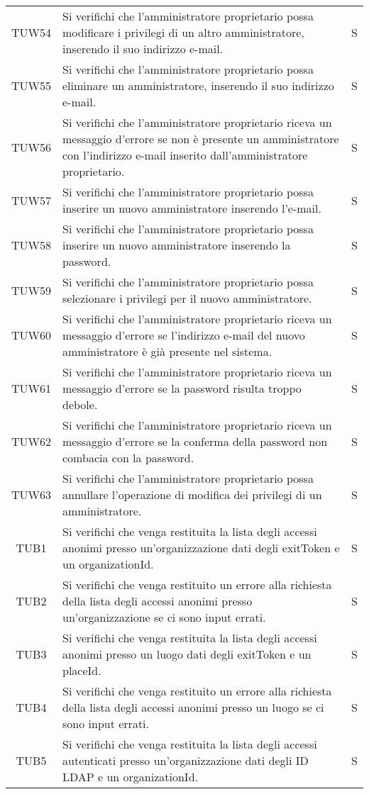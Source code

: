 {\begin{longtable}{ c C{13cm} C{1cm}}
TUW54 & Si verifichi che l’amministratore proprietario possa modificare i privilegi di un altro amministratore, inserendo il suo indirizzo e-mail. & S \\
TUW55 & Si verifichi che l’amministratore proprietario possa eliminare un amministratore, inserendo il suo indirizzo e-mail. & S \\
TUW56 & Si verifichi che l’amministratore proprietario riceva un messaggio d'errore se non è presente un amministratore con l'indirizzo e-mail inserito dall'amministratore proprietario. & S \\
TUW57 & Si verifichi che l’amministratore proprietario possa inserire un nuovo amministratore inserendo l’e-mail. & S \\
TUW58 & Si verifichi che l’amministratore proprietario possa inserire un nuovo amministratore inserendo la password. & S \\
TUW59 & Si verifichi che l’amministratore proprietario possa selezionare i privilegi per il nuovo amministratore. & S \\
TUW60 & Si verifichi che l’amministratore proprietario riceva un messaggio d'errore se l'indirizzo e-mail del nuovo amministratore è già presente nel sistema. & S \\
TUW61 & Si verifichi che l’amministratore proprietario riceva un messaggio d'errore se la password risulta troppo debole. & S \\
TUW62 & Si verifichi che l’amministratore proprietario riceva un messaggio d'errore se la conferma della password non combacia con la password. & S \\
TUW63 & Si verifichi che l’amministratore proprietario possa annullare l'operazione di modifica dei privilegi di un amministratore.  & S \\
TUB1 & Si verifichi che venga restituita la lista degli accessi anonimi presso un'organizzazione dati degli exitToken e un organizationId. & S \\
TUB2 & Si verifichi che venga restituito un errore alla richiesta della lista degli accessi anonimi presso un'organizzazione se ci sono input errati. & S \\
TUB3 & Si verifichi che venga restituita la lista degli accessi anonimi presso un luogo dati degli exitToken e un placeId. & S \\
TUB4 & Si verifichi che venga restituito un errore alla richiesta della lista degli accessi anonimi presso un luogo se ci sono input errati. & S \\
TUB5 & Si verifichi che venga restituita la lista degli accessi autenticati presso un'organizzazione dati degli ID LDAP e un organizationId. & S \\

\end{longtable}}
